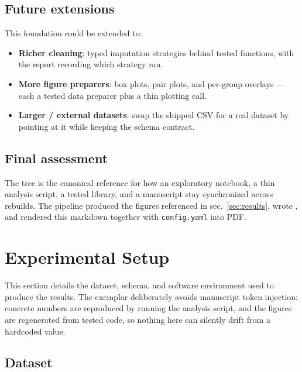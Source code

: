 \documentclass[
]{article}
\providecommand{\tightlist}{%
  \setlength{\itemsep}{0pt}\setlength{\parskip}{0pt}}
\begin{document}
\subsection{Future extensions}\label{future-extensions}

This foundation could be extended to:

\begin{itemize}
\tightlist
\item
  \textbf{Richer cleaning}: typed imputation strategies behind tested
  functions, with the report recording which strategy ran.
\item
  \textbf{More figure preparers}: box plots, pair plots, and per-group
  overlays --- each a tested data preparer plus a thin plotting call.
\item
  \textbf{Larger / external datasets}: swap the shipped CSV for a real
  dataset by pointing  at it while
  keeping the schema contract.
\end{itemize}

\subsection{Final assessment}\label{final-assessment}

The  tree is the canonical reference for
how an exploratory notebook, a thin analysis script, a tested library,
and a manuscript stay synchronized across rebuilds. The pipeline
produced the figures referenced in sec.~\ref{sec:results}, wrote
, and rendered this markdown
together with \texttt{config.yaml} into PDF.

\newpage

\section{Experimental Setup}\label{sec:experimental_setup}

This section details the dataset, schema, and software environment used
to produce the results. The exemplar deliberately avoids manuscript
token injection: concrete numbers are reproduced by running the analysis
script, and the figures are regenerated from tested code, so nothing
here can silently drift from a hardcoded value.

\subsection{Dataset}\label{dataset}
\end{document}
